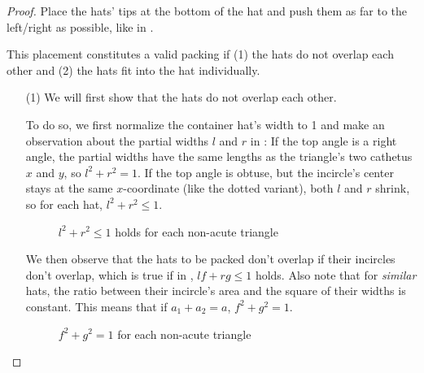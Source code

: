 \documentclass[%
    a4paper,              %
    style=screen,          %
    bibliography=totoc,   %
    nexus,                %
    lnum,                 %
    extramargin,          %
]{tubsbook}
\begin{document}
\begin{proof}
    Place the hats' tips at the bottom of the hat and push them as far to the left/right as possible, like in .

    This placement constitutes a valid packing if (1) the hats do not overlap each other and (2) the hats fit into the hat individually.
    \begin{itemize}
        \item[(1)]
            We will first show that the hats do not overlap each other.

            To do so, we first normalize the container hat's width to 1 and make an observation about the partial widths $l$ and $r$ in : If the top angle is a right angle, the partial widths have the same lengths as the triangle's two cathetus $x$ and $y$, so $l^2 + r^2 = 1$. If the top angle is obtuse, but the incircle's center stays at the same $x$-coordinate (like the dotted variant), both $l$ and $r$ shrink, so for each hat, $l^2 + r^2 \le 1$.

            \begin{figure}[htbp!]
                \centering


                \caption{$l^2 + r^2 \le 1$ holds for each non-acute triangle}
                \label{fig:hatlr}
            \end{figure}

            We then observe that the hats to be packed don't overlap if their incircles don't overlap, which is true if in , $lf + rg \le 1$ holds. Also note that for \emph{similar} hats, the ratio between their incircle's area and the square of their widths is constant. This means that if $a_1 + a_2 = a$, $f^2 + g^2 = 1$.

            \begin{figure}[htbp!]
                \centering


                \caption{$f^2 + g^2 = 1$ for each non-acute triangle}
                \label{fig:hatsoverlap}
            \end{figure}


\end{itemize}
\end{proof}
\end{document}
